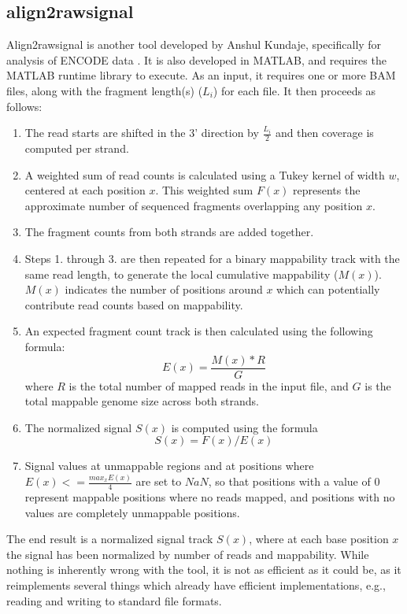\documentclass[a4paper]{article}
\begin{document}
    \subsection{align2rawsignal}
    Align2rawsignal is another tool developed by Anshul Kundaje, specifically for analysis of ENCODE data \cite{hoffman_integrative_2013}.
    It is also developed in MATLAB, and requires the MATLAB runtime library to execute. As an input, it requires one or more
    BAM files, along with the fragment length(s) ($L_i$) for each file. It then proceeds as follows:
    \begin{enumerate}
      \item The read starts are shifted in the 3' direction by $\frac{L_i}{2}$ and then coverage is computed per strand.
      \item A weighted sum of read counts is calculated using a Tukey kernel of width $w$, centered at each position $x$.
            This weighted sum $F(x)$ represents the approximate number of sequenced fragments overlapping any position $x$.
      \item The fragment counts from both strands are added together.
      \item Steps 1. through 3. are then repeated for a binary mappability track with the same read length, to generate the
            local cumulative mappability ($M(x)$). $M(x)$ indicates the number of positions around $x$ which can potentially
            contribute read counts based on mappability.
      \item An expected fragment count track is then calculated using the following formula:
      \begin{equation}
        \label{eq:1}
        E(x) = \frac{M(x)*R}{G}
      \end{equation}
      where $R$ is the total number of mapped reads in the input file, and $G$ is the total mappable genome size across both strands.
      \item The normalized signal $S(x)$ is computed using the formula
      \begin{equation}
        \label{eq:2}
        S(x) = F(x) / E(x)
      \end{equation}
      \item Signal values at unmappable regions and at positions where $E(x) <= \frac{max_xE(x)}{4}$ are set to $NaN$, so that
            positions with a value of 0 represent mappable positions where no reads mapped, and positions with no values
            are completely unmappable positions.
    \end{enumerate}
    The end result is a normalized signal track $S(x)$, where at each base position $x$ the signal has been normalized by
    number of reads and mappability. While nothing is inherently wrong with the tool, it is not as efficient as it could be,
    as it reimplements several things which already have efficient implementations, e.g., reading and writing to standard file formats.
\end{document}
